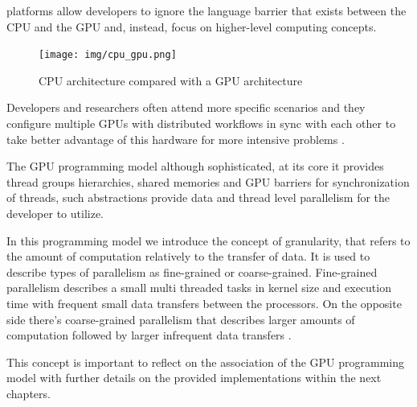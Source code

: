 \documentclass[
  oneside,
  11pt, a4paper,
  footinclude=true,
  headinclude=true,
  cleardoublepage=empty
]{scrbook}
\begin{document}
platforms allow developers to ignore the language barrier that exists between the CPU and the GPU and, instead, focus on higher-level computing concepts.

\begin{figure}[h]
    \centering
    \texttt{[image: img/cpu\_gpu.png]}
    \caption{CPU architecture compared with a GPU architecture}
    \label{fig:cpu-gpu}
\end{figure}

Developers and researchers often attend more specific scenarios and they configure multiple GPUs with distributed workflows in sync with each other to take better advantage of this hardware for more intensive problems \cite{heldens2022lightning}.

The GPU programming model although sophisticated, at its core it provides thread groups hierarchies, shared memories and GPU barriers for synchronization of threads, such abstractions provide data and thread level parallelism for the developer to utilize. \newline

In this programming model we introduce the concept of granularity, that refers to the amount of computation relatively to the transfer of data. It is used to describe types of parallelism as fine-grained or coarse-grained. 
Fine-grained parallelism describes a small multi threaded tasks in kernel size and execution time with frequent small data transfers between the processors. On the opposite side there's coarse-grained parallelism that describes larger amounts of computation followed by larger infrequent data transfers \cite{CUDAcppguide}.


This concept is important to reflect on the association of the GPU programming model with further details on the provided implementations within the next chapters. \newline
\end{document}
